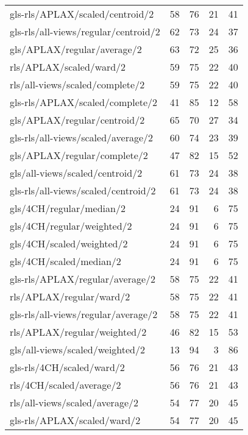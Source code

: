 \begin{longtable}{lrrrr}
    gls-rls/APLAX/scaled/centroid/2           & 58 & 76 & 21 & 41 \\
    gls-rls/all-views/regular/centroid/2      & 62 & 73 & 24 & 37 \\
    gls/APLAX/regular/average/2               & 63 & 72 & 25 & 36 \\
    rls/APLAX/scaled/ward/2                   & 59 & 75 & 22 & 40 \\
    rls/all-views/scaled/complete/2           & 59 & 75 & 22 & 40 \\
    gls-rls/APLAX/scaled/complete/2           & 41 & 85 & 12 & 58 \\
    gls/APLAX/regular/centroid/2              & 65 & 70 & 27 & 34 \\
    gls-rls/all-views/scaled/average/2        & 60 & 74 & 23 & 39 \\
    gls/APLAX/regular/complete/2              & 47 & 82 & 15 & 52 \\
    gls/all-views/scaled/centroid/2           & 61 & 73 & 24 & 38 \\
    gls-rls/all-views/scaled/centroid/2       & 61 & 73 & 24 & 38 \\
    gls/4CH/regular/median/2                  & 24 & 91 &  6 & 75 \\
    gls/4CH/regular/weighted/2                & 24 & 91 &  6 & 75 \\
    gls/4CH/scaled/weighted/2                 & 24 & 91 &  6 & 75 \\
    gls/4CH/scaled/median/2                   & 24 & 91 &  6 & 75 \\
    gls-rls/APLAX/regular/average/2           & 58 & 75 & 22 & 41 \\
    rls/APLAX/regular/ward/2                  & 58 & 75 & 22 & 41 \\
    gls-rls/all-views/regular/average/2       & 58 & 75 & 22 & 41 \\
    rls/APLAX/regular/weighted/2              & 46 & 82 & 15 & 53 \\
    gls/all-views/scaled/weighted/2           & 13 & 94 &  3 & 86 \\
    gls-rls/4CH/scaled/ward/2                 & 56 & 76 & 21 & 43 \\
    rls/4CH/scaled/average/2                  & 56 & 76 & 21 & 43 \\
    rls/all-views/scaled/average/2            & 54 & 77 & 20 & 45 \\
    gls-rls/APLAX/scaled/ward/2               & 54 & 77 & 20 & 45 \\

\end{longtable}
